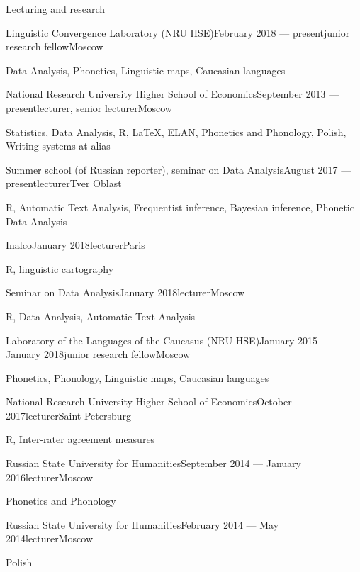\documentclass{resume} %
\begin{document}
\begin{rSection}{Lecturing and research}
\begin{rSubsection}{Linguistic Convergence Laboratory (NRU HSE)}{February 2018 --- present}{junior research fellow}{Moscow}
\item Data Analysis, Phonetics, Linguistic maps, Caucasian languages
\end{rSubsection}
\begin{rSubsection}{National Research University Higher School of Economics}{September 2013 --- present}{lecturer, senior lecturer}{Moscow}
\item Statistics, Data Analysis, R, \LaTeX, ELAN, Phonetics and Phonology, Polish, Writing systems at alias
\end{rSubsection}
\begin{rSubsection}{Summer school (of Russian reporter), seminar on Data Analysis}{August 2017 --- present}{lecturer}{Tver Oblast}
\item R, Automatic Text Analysis, Frequentist inference, Bayesian inference, Phonetic Data Analysis
\end{rSubsection}
\begin{rSubsection}{Inalco}{January 2018}{lecturer}{Paris}
\item R, linguistic cartography
\end{rSubsection}
\begin{rSubsection}{Seminar on Data Analysis}{January 2018}{lecturer}{Moscow}
\item R, Data Analysis, Automatic Text Analysis
\end{rSubsection}
\begin{rSubsection}{Laboratory of the Languages of the Caucasus (NRU HSE)}{January 2015 --- January 2018}{junior research fellow}{Moscow}
\item Phonetics, Phonology, Linguistic maps, Caucasian languages
\end{rSubsection}
\begin{rSubsection}{National Research University Higher School of Economics}{October 2017}{lecturer}{Saint Petersburg}
\item R, Inter-rater agreement measures
\end{rSubsection}
\begin{rSubsection}{Russian State University for Humanities}{September 2014 --- January 2016}{lecturer}{Moscow}
\item Phonetics and Phonology
\end{rSubsection}
\begin{rSubsection}{Russian State University for Humanities}{February 2014 --- May 2014}{lecturer}{Moscow}
\item Polish
\end{rSubsection}

\end{rSection}
\end{document}
